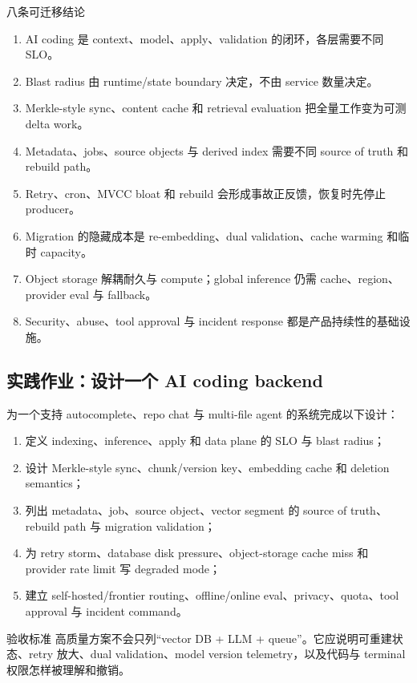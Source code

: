 \documentclass[a4paper]{article}
\begin{document}
\begin{importantbox}{八条可迁移结论}
\begin{enumerate}
  \item AI coding 是 context、model、apply、validation 的闭环，各层需要不同 SLO。
  \item Blast radius 由 runtime/state boundary 决定，不由 service 数量决定。
  \item Merkle-style sync、content cache 和 retrieval evaluation 把全量工作变为可测 delta work。
  \item Metadata、jobs、source objects 与 derived index 需要不同 source of truth 和 rebuild path。
  \item Retry、cron、MVCC bloat 和 rebuild 会形成事故正反馈，恢复时先停止 producer。
  \item Migration 的隐藏成本是 re-embedding、dual validation、cache warming 和临时 capacity。
  \item Object storage 解耦耐久与 compute；global inference 仍需 cache、region、provider eval 与 fallback。
  \item Security、abuse、tool approval 与 incident response 都是产品持续性的基础设施。
\end{enumerate}
\end{importantbox}

\subsection{实践作业：设计一个 AI coding backend}

为一个支持 autocomplete、repo chat 与 multi-file agent 的系统完成以下设计：

\begin{enumerate}
  \item 定义 indexing、inference、apply 和 data plane 的 SLO 与 blast radius；
  \item 设计 Merkle-style sync、chunk/version key、embedding cache 和 deletion semantics；
  \item 列出 metadata、job、source object、vector segment 的 source of truth、rebuild path 与 migration validation；
  \item 为 retry storm、database disk pressure、object-storage cache miss 和 provider rate limit 写 degraded mode；
  \item 建立 self-hosted/frontier routing、offline/online eval、privacy、quota、tool approval 与 incident command。
\end{enumerate}

\begin{knowledgebox}{验收标准}
高质量方案不会只列“vector DB + LLM + queue”。它应说明可重建状态、retry 放大、dual validation、model version telemetry，以及代码与 terminal 权限怎样被理解和撤销。
\end{knowledgebox}
\end{document}
